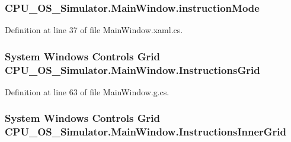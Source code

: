 \subsubsection[{instruction\+Mode}]{ C\+P\+U\+\_\+\+O\+S\+\_\+\+Simulator.\+Main\+Window.\+instruction\+Mode\hspace{0.3cm}{\ttfamily [private]}}\label{class_c_p_u___o_s___simulator_1_1_main_window_adcf36837be53f52843bbeb354a16d15c}


Definition at line 37 of file Main\+Window.\+xaml.\+cs.

\hypertarget{class_c_p_u___o_s___simulator_1_1_main_window_a2e6841673af413e8a8f8ba8aa0d7c80b}{}
\subsubsection[{Instructions\+Grid}]{\setlength{\rightskip}{0pt plus 5cm}System Windows Controls Grid C\+P\+U\+\_\+\+O\+S\+\_\+\+Simulator.\+Main\+Window.\+Instructions\+Grid\hspace{0.3cm}{\ttfamily [package]}}\label{class_c_p_u___o_s___simulator_1_1_main_window_a2e6841673af413e8a8f8ba8aa0d7c80b}


Definition at line 63 of file Main\+Window.\+g.\+cs.

\hypertarget{class_c_p_u___o_s___simulator_1_1_main_window_a94a99eeb7f5fcfcfbdc375937d5439e7}{}
\subsubsection[{Instructions\+Inner\+Grid}]{\setlength{\rightskip}{0pt plus 5cm}System Windows Controls Grid C\+P\+U\+\_\+\+O\+S\+\_\+\+Simulator.\+Main\+Window.\+Instructions\+Inner\+Grid\hspace{0.3cm}{\ttfamily [package]}}\label{class_c_p_u___o_s___simulator_1_1_main_window_a94a99eeb7f5fcfcfbdc375937d5439e7}


